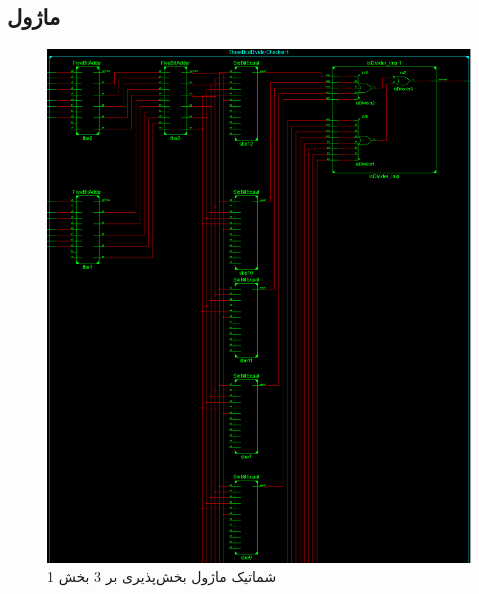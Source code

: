 \documentclass[fleqn]{article}
\begin{document}
\subsection{ماژول }
\begin{figure}[H]
	\centering
	\includegraphics[width=.5\paperwidth]{./Schematic/TBDC1.png}
	\caption{شماتیک ماژول بخش‌پذیری بر 3 بخش 1}
	\label{tbdc31}
\end{figure}
\end{document}
